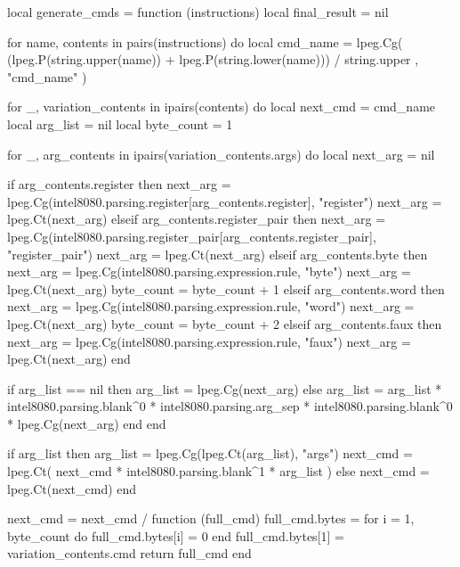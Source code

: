 local generate_cmds = function (instructions)
    local final_result = nil

    for name, contents in pairs(instructions) do
        local cmd_name = lpeg.Cg(
            (lpeg.P(string.upper(name)) + lpeg.P(string.lower(name))) / string.upper
            , "cmd_name"
        )

        for _, variation_contents in ipairs(contents) do
            local next_cmd = cmd_name
            local arg_list = nil
            local byte_count = 1

            for _, arg_contents in ipairs(variation_contents.args) do
                local next_arg = nil

                if arg_contents.register then
                    next_arg = lpeg.Cg(intel8080.parsing.register[arg_contents.register], "register")
                    next_arg = lpeg.Ct(next_arg)
                elseif arg_contents.register_pair then
                    next_arg = lpeg.Cg(intel8080.parsing.register_pair[arg_contents.register_pair], "register_pair")
                    next_arg = lpeg.Ct(next_arg)
                elseif arg_contents.byte then
                    next_arg = lpeg.Cg(intel8080.parsing.expression.rule, "byte")
                    next_arg = lpeg.Ct(next_arg)
                    byte_count = byte_count + 1
                elseif arg_contents.word then
                    next_arg = lpeg.Cg(intel8080.parsing.expression.rule, "word")
                    next_arg = lpeg.Ct(next_arg)
                    byte_count = byte_count + 2
                elseif arg_contents.faux then
                    next_arg = lpeg.Cg(intel8080.parsing.expression.rule, "faux")
                    next_arg = lpeg.Ct(next_arg)
                end

                if arg_list == nil then
                    arg_list = lpeg.Cg(next_arg)
                else
                    arg_list = arg_list * intel8080.parsing.blank^0 * intel8080.parsing.arg_sep * intel8080.parsing.blank^0 * lpeg.Cg(next_arg)
                end
            end

            if arg_list then
                arg_list = lpeg.Cg(lpeg.Ct(arg_list), "args")
                next_cmd = lpeg.Ct(
                    next_cmd * intel8080.parsing.blank^1 * arg_list
                )
            else
                next_cmd = lpeg.Ct(next_cmd)
            end

            next_cmd = next_cmd
                / function (full_cmd)
                    full_cmd.bytes = {}
                    for i = 1, byte_count do
                        full_cmd.bytes[i] = 0
                    end
                    full_cmd.bytes[1] = variation_contents.cmd
                    return full_cmd
                end

